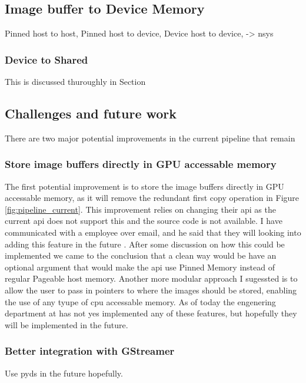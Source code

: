 \subsection{Image buffer to Device Memory}
Pinned host to host,
Pinned host to device,
Device host to device, -> nsys

\subsubsection{Device to Shared}
This is discussed thuroughly in Section




\subsection{Challenges and future work}
There are two major potential improvements in the current pipeline that remain

\subsubsection{Store image buffers directly in GPU accessable memory}
The first potential improvement is to store the image buffers directly in GPU accessable memory, as it will remove the redundant first copy operation in Figure \ref{fig:pipeline_current}.
This improvement relies on \lucid changing their \gls{api} as the current \gls{api} does not support this and the source code is not available.
I have communicated with a \lucid employee over email, and he said that they will looking into adding this feature in the future \cite{martensRe17896Use2023}.
After some discussion on how this could be implemented we came to the conclusion that a clean way would be have an optional argument that would make the \gls{api} use Pinned Memory instead of regular Pageable host memory.
Another more modular approach I sugessted is to allow the user to pass in pointers to where the images should be stored, enabling the use of any tyupe of \gls{cpu} accessable memory.
As of today the engenering department at \lucid has not yes implemented any of these features, but hopefully they will be implemented in the future.

\subsubsection{Better integration with GStreamer}
Use \gls{pyds} in the future hopefully.


